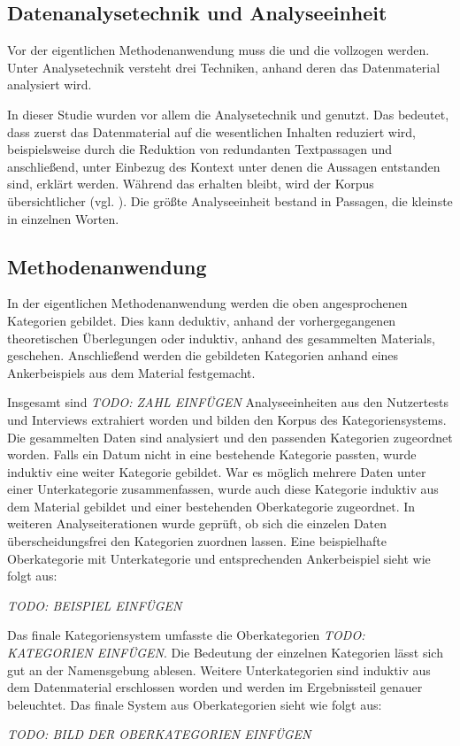 \subsection{Datenanalysetechnik und Analyseeinheit}
Vor der eigentlichen Methodenanwendung muss die  und die  vollzogen werden. Unter Analysetechnik versteht \citeauthor{mayring2010qualitative} drei Techniken, anhand deren das Datenmaterial analysiert wird.

In dieser Studie wurden vor allem die Analysetechnik  und  genutzt. Das bedeutet, dass zuerst das Datenmaterial auf die wesentlichen Inhalten reduziert wird, beispielsweise durch die Reduktion von redundanten Textpassagen und anschließend, unter Einbezug des Kontext unter denen die Aussagen entstanden sind, erklärt werden. Während das  erhalten bleibt, wird der Korpus übersichtlicher (vgl. \cite[115]{mayring2010qualitative}). Die größte Analyseeinheit bestand in Passagen, die kleinste in einzelnen Worten.

\subsection{Methodenanwendung}
In der eigentlichen Methodenanwendung werden die oben angesprochenen Kategorien gebildet. Dies kann deduktiv, anhand der vorhergegangenen theoretischen Überlegungen oder induktiv, anhand des gesammelten Materials, geschehen. Anschließend werden die gebildeten Kategorien anhand eines Ankerbeispiels aus dem Material festgemacht.

Insgesamt sind \emph{TODO: ZAHL EINFÜGEN} Analyseeinheiten aus den Nutzertests und Interviews extrahiert worden und bilden den Korpus des Kategoriensystems. Die gesammelten Daten sind analysiert und den passenden Kategorien zugeordnet worden. Falls ein Datum nicht in eine bestehende Kategorie passten, wurde induktiv eine weiter Kategorie gebildet. War es möglich mehrere Daten unter einer Unterkategorie zusammenfassen, wurde auch diese Kategorie induktiv aus dem Material gebildet und einer bestehenden Oberkategorie zugeordnet. In weiteren Analyseiterationen wurde geprüft, ob sich die einzelen Daten überscheidungsfrei den Kategorien zuordnen lassen. Eine beispielhafte Oberkategorie mit Unterkategorie und entsprechenden Ankerbeispiel sieht wie folgt aus:

\emph{TODO: BEISPIEL EINFÜGEN}

Das finale Kategoriensystem umfasste die Oberkategorien \emph{TODO: KATEGORIEN EINFÜGEN}. Die Bedeutung der einzelnen Kategorien lässt sich gut an der Namensgebung ablesen. Weitere Unterkategorien sind induktiv aus dem Datenmaterial erschlossen worden und werden im Ergebnissteil genauer beleuchtet. Das finale System aus Oberkategorien sieht wie folgt aus:

\emph{TODO: BILD DER OBERKATEGORIEN EINFÜGEN}